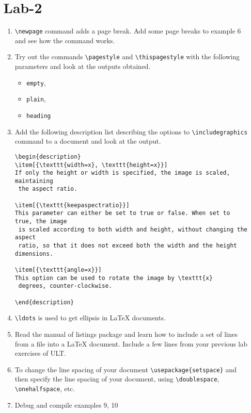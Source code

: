 \documentclass[11pt]{article}
\begin{document}
\section{Lab-2}
\label{sec-2}


\begin{enumerate}
\item \texttt{\textbackslash{}newpage} command adds a page break. Add some page breaks to
     example 6 and see how the command works.
\item Try out the commands \texttt{\textbackslash{}pagestyle} and \texttt{\textbackslash{}thispagestyle} with the
     following parameters and look at the outputs obtained.

\begin{itemize}
\item \texttt{empty},
\item \texttt{plain},
\item \texttt{heading}
\end{itemize}

\item Add the following description list describing the options to
     \texttt{\textbackslash{}includegraphics} command to a document and look at the output. 

\begin{verbatim}
\begin{description}
\item[{\texttt{width=x}, \texttt{height=x}}] 
If only the height or width is specified, the image is scaled, maintaining
 the aspect ratio.

\item[{\texttt{keepaspectratio}}]  
This parameter can either be set to true or false. When set to true, the image
 is scaled according to both width and height, without changing the aspect
 ratio, so that it does not exceed both the width and the height dimensions.

\item[{\texttt{angle=x}}] 
This option can be used to rotate the image by \texttt{x}
 degrees, counter-clockwise.

\end{description}
\end{verbatim}
\item \texttt{\textbackslash{}ldots} is used to get ellipsis in \LaTeX{} documents.
\item Read the manual of listings package and learn how to include a
     set of lines from a file into a \LaTeX{} document. Include a few
     lines from your previous lab exercises of ULT.
\item To change the line spacing of your document
     \texttt{\textbackslash{}usepackage\{setspace\}} and then specify the line spacing of
     your document, using \texttt{\textbackslash{}doublespace}, \texttt{\textbackslash{}onehalfspace}, etc.
\item Debug and compile examples 9, 10
\end{enumerate}
\end{document}
